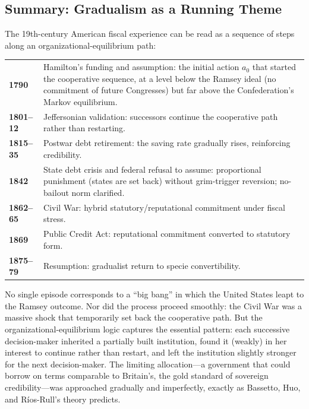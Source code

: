\documentclass[12pt]{article}
\begin{document}
\subsection{Summary: Gradualism as a Running Theme}

The 19th-century American fiscal experience can be read as a sequence of
steps along an organizational-equilibrium path:

\begin{center}
\begin{tabular}{lp{10cm}}
  \textbf{1790} & Hamilton's funding and assumption: the initial action
    $a_0$ that started the cooperative sequence, at a level below the
    Ramsey ideal (no commitment of future Congresses) but far above
    the Confederation's Markov equilibrium. \\[4pt]
  \textbf{1801--12} & Jeffersonian validation: successors continue the
    cooperative path rather than restarting. \\[4pt]
  \textbf{1815--35} & Postwar debt retirement: the saving rate gradually
    rises, reinforcing credibility. \\[4pt]
  \textbf{1842} & State debt crisis and federal refusal to assume:
    proportional punishment (states are set back) without grim-trigger
    reversion; no-bailout norm clarified. \\[4pt]
  \textbf{1862--65} & Civil War: hybrid statutory/reputational commitment
    under fiscal stress. \\[4pt]
  \textbf{1869} & Public Credit Act: reputational commitment converted to
    statutory form. \\[4pt]
  \textbf{1875--79} & Resumption: gradualist return to specie
    convertibility. \\[4pt]
\end{tabular}
\end{center}

No single episode corresponds to a ``big bang'' in which the United States
leapt to the Ramsey outcome.  Nor did the process proceed smoothly: the
Civil War was a massive shock that temporarily set back the cooperative
path.  But the organizational-equilibrium logic captures the essential
pattern: each successive decision-maker inherited a partially built
institution, found it (weakly) in her interest to continue rather than
restart, and left the institution slightly stronger for the next
decision-maker.  The limiting allocation---a government that could borrow
on terms comparable to Britain's, the gold standard of sovereign
credibility---was approached gradually and imperfectly, exactly as
Bassetto, Huo, and R\'ios-Rull's theory predicts.
\end{document}
